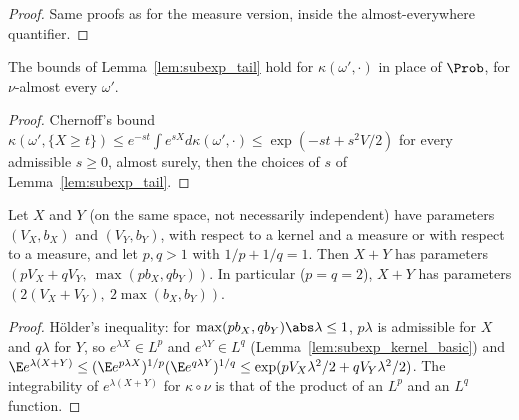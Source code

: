 \begin{proof}
\leanok
{}
Same proofs as for the measure version, inside the almost-everywhere quantifier.
\end{proof}

\begin{lemma}\label{lem:subexp_kernel_tail}
\leanok
{}
The bounds of Lemma~\ref{lem:subexp_tail} hold for $\kappa(\omega',\cdot)$ in place of
$\Prob$, for $\nu$-almost every $\omega'$.
\end{lemma}

\begin{proof}
\leanok
{}
Chernoff's bound $\kappa(\omega',\{X\ge t\}) \le e^{-st}\int e^{sX}d\kappa(\omega',\cdot)
\le \exp(-st + s^2V/2)$ for every admissible $s \ge 0$, almost surely, then the choices of
$s$ of Lemma~\ref{lem:subexp_tail}.
\end{proof}

\begin{lemma}\label{lem:subexp_add_holder}
\leanok
{}
Let $X$ and $Y$ (on the same space, not necessarily independent) have parameters $(V_X, b_X)$
and $(V_Y, b_Y)$, with respect to a kernel and a measure or with respect to a measure, and
let $p, q > 1$ with $1/p + 1/q = 1$. Then $X + Y$ has parameters
$(pV_X + qV_Y,\ \max(pb_X, qb_Y))$. In particular ($p = q = 2$), $X+Y$ has parameters
$(2(V_X + V_Y),\ 2\max(b_X, b_Y))$.
\end{lemma}

\begin{proof}
\leanok
{}
Hölder's inequality: for $\max(pb_X, qb_Y)\abs\lambda \le 1$, $p\lambda$ is admissible for
$X$ and $q\lambda$ for $Y$, so $e^{\lambda X}\in L^p$ and $e^{\lambda Y} \in L^q$
(Lemma~\ref{lem:subexp_kernel_basic}) and
$\E e^{\lambda(X+Y)} \le (\E e^{p\lambda X})^{1/p}(\E e^{q\lambda Y})^{1/q}
\le \exp(pV_X\lambda^2/2 + qV_Y\lambda^2/2)$. The integrability of $e^{\lambda(X+Y)}$ for
$\kappa\circ\nu$ is that of the product of an $L^p$ and an $L^q$ function.
\end{proof}

